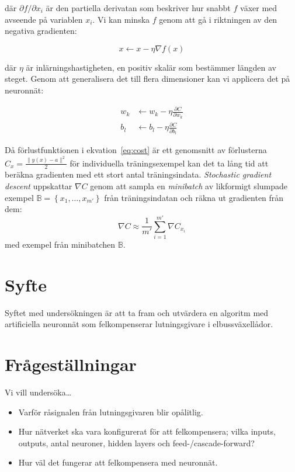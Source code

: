där $ \partial f / \partial x_i $ är den partiella derivatan
som beskriver hur snabbt $ f $ växer med avseende på variablen $ x_i $.
Vi kan minska $ f $ genom att gå i riktningen av den negativa gradienten:

\begin{equation}
	x \leftarrow x - \eta \nabla f(x)
\end{equation}

där $ \eta $ är inlärningshastigheten,
en positiv skalär som bestämmer längden av steget.
Genom att generalisera det till flera dimensioner kan vi
applicera det på neuronnät:

\begin{align}
	w_k &\leftarrow w_k - \eta \frac{\partial C}{\partial w_k} \\
	b_l &\leftarrow b_l - \eta \frac{\partial C}{\partial b_l}
\end{align}

Då förlustfunktionen i ekvation~\eqref{eq:cost} är ett genomsnitt av
förlusterna $ C_x = \frac{\lVert y(x) - a \rVert^2}{2} $ för individuella träningsexempel
kan det ta lång tid att beräkna gradienten med ett stort antal träningsindata.
\emph{Stochastic gradient descent} uppskattar $ \nabla C $ genom att
sampla en \emph{minibatch} av likformigt slumpade exempel
$ \mathbb{B} = \left\{ x_1, \dotsc, x_{m'} \right\} $ från träningsindatan
och räkna ut gradienten från dem:
\begin{equation}
	\nabla C \approx \frac{1}{m'} \sum^{m'}_{i=1} \nabla C_{x_i}
\end{equation}
med exempel från minibatchen $ \mathbb{B} $.

\section{Syfte}
Syftet med undersökningen är att ta fram och utvärdera en algoritm med
artificiella neuronnät som felkompenserar lutningsgivare i elbussväxellådor.

\section{Frågeställningar}
Vi vill undersöka\ldots
\begin{itemize}
	\item Varför råsignalen från lutningsgivaren blir opålitlig.
	\item Hur nätverket ska vara konfigurerat för att felkompensera; vilka inputs,
		outputs, antal neuroner, hidden layers och feed-/cascade-forward?
	\item Hur väl det fungerar att felkompensera med neuronnät.
\end{itemize}
